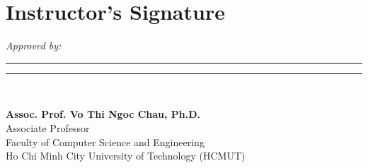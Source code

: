 \section*{Instructor’s Signature}
\vspace{2cm}

\begin{flushleft}
    \textit{Approved by:} \\[1.5cm]
    
    \rule{7cm}{0.4pt} \hfill \rule{4cm}{0.4pt} \\
     \hfill {}
    
    \vspace{0.8cm}
    {\large \textbf{Assoc. Prof. Vo Thi Ngoc Chau, Ph.D.}} \\
    Associate Professor \\
    Faculty of Computer Science and Engineering \\
    Ho Chi Minh City University of Technology (HCMUT)
\end{flushleft}
\clearpage
